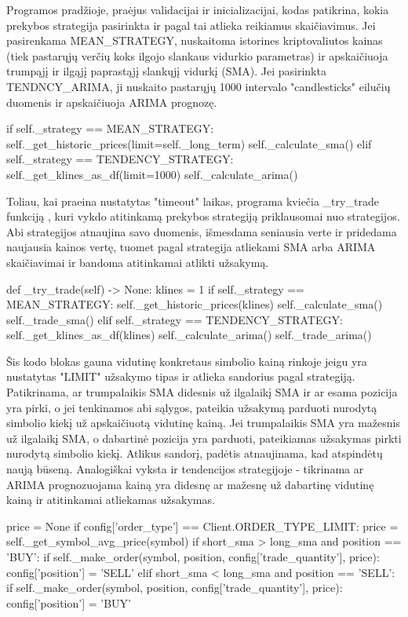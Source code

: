 \documentclass{VUMIFInfKursinis}
\begin{document}
Programos pradžioje, praėjus validacijai ir inicializacijai, kodas patikrina, kokia prekybos strategija pasirinkta ir pagal tai atlieka reikiamus skaičiavimus. Jei pasirenkama MEAN\_STRATEGY, nuskaitoma istorines kriptovaliutos kainas (tiek pastarųjų verčių koks ilgojo slankaus vidurkio parametras) ir apskaičiuoja trumpąjį ir ilgąjį paprastąjį slankųjį vidurkį (SMA). Jei pasirinkta TENDNCY\_ARIMA, ji nuskaito pastarųjų 1000 intervalo "candlesticks" eilučių duomenis ir apskaičiuoja ARIMA prognozę.
\begin{python}
  if self._strategy == MEAN_STRATEGY:
  self._get_historic_prices(limit=self._long_term)
  self._calculate_sma()
  elif self._strategy == TENDENCY_STRATEGY:
  self._get_klines_as_df(limit=1000)
  self._calculate_arima()
\end{python}

Toliau, kai praeina nustatytas "timeout" laikas, programa kviečia \_try\_trade funkciją , kuri vykdo atitinkamą prekybos strategiją priklausomai nuo strategijos. Abi strategijos atnaujina savo duomenis, išmesdama seniausia verte ir pridedama
naujausia kainos vertę, tuomet pagal strategija atliekami SMA arba ARIMA skaičiavimai ir bandoma atitinkamai atlikti 
užsakymą.

\begin{python}
  def _try_trade(self) -> None:
  klines = 1
  if self._strategy == MEAN_STRATEGY:
  self._get_historic_prices(klines)
  self._calculate_sma()
  self._trade_sma()
  elif self._strategy == TENDENCY_STRATEGY:
  self._get_klines_as_df(klines)
  self._calculate_arima()
  self._trade_arima()
\end{python}

Šis kodo blokas gauna vidutinę konkretaus simbolio kainą rinkoje jeigu yra nustatytas "LIMIT" užsakymo tipas ir atlieka sandorius pagal strategiją. Patikrinama, ar trumpalaikis SMA didesnis už ilgalaikį SMA ir ar esama pozicija yra pirki, o jei tenkinamos abi sąlygos, pateikia užsakymą parduoti nurodytą simbolio kiekį už apskaičiuotą vidutinę kainą. Jei trumpalaikis SMA yra mažesnis už ilgalaikį SMA, o dabartinė pozicija yra parduoti, pateikiamas užsakymas pirkti nurodytą simbolio kiekį. Atlikus sandorį, padėtis atnaujinama, kad atspindėtų naują būseną. Analogiškai vyksta ir tendencijos strategijoje - tikrinama ar ARIMA prognozuojama kainą yra didesnę ar mažesnę už dabartinę vidutinę kainą ir atitinkamai atliekamas užsakymas.

\begin{python}
  price = None
  if config['order_type'] == Client.ORDER_TYPE_LIMIT:
  price = self._get_symbol_avg_price(symbol)
  if short_sma > long_sma and position == 'BUY':
  if self._make_order(symbol, position, config['trade_quantity'], price):
  config['position'] = 'SELL'
  elif short_sma < long_sma and position == 'SELL':
  if self._make_order(symbol, position, config['trade_quantity'], price):
  config['position'] = 'BUY'
\end{python}
\end{document}
